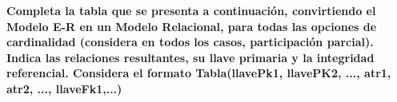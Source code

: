 \textbf{Completa la tabla que se presenta a continuación, convirtiendo el Modelo E-R en un Modelo Relacional, para todas
las opciones de cardinalidad (considera en todos los casos, participación parcial). Indica las relaciones resultantes,
su llave primaria y la integridad referencial. Considera el formato Tabla(llavePk1, llavePK2, ..., atr1, atr2, ..., llaveFk1,...)}\vspace{.3cm}
